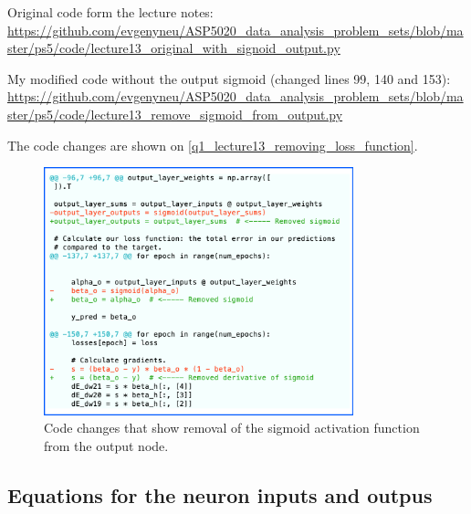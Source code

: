 Original code form the lecture notes: \\ \url{https://github.com/evgenyneu/ASP5020_data_analysis_problem_sets/blob/master/ps5/code/lecture13_original_with_signoid_output.py}

My modified code without the output sigmoid (changed lines 99, 140 and 153): \\ \url{https://github.com/evgenyneu/ASP5020_data_analysis_problem_sets/blob/master/ps5/code/lecture13_remove_sigmoid_from_output.py}

The code changes are shown on \autoref{q1_lecture13_removing_loss_function}.


\begin{figure}[!ht]
  \centering
  \includegraphics[width=0.8\textwidth]{figures/q1_lecture13_code_changes.png}
  \caption{Code changes that show removal of the sigmoid activation function from the output node.}
  \label{q1_lecture13_removing_loss_function}
\end{figure}



\subsection{Equations for the neuron inputs and outpus}

